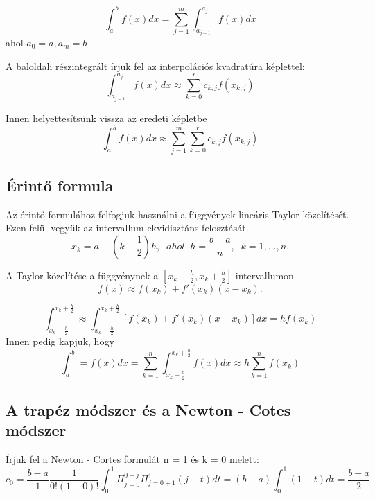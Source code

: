 \documentclass{article}
\theoremstyle{definition}
\theoremstyle{theorem}
\begin{document}
\begin{equation*}
 \int_a^{b} f(x) dx = \sum_{j = 1} ^{m} \int_{a_{j-1}} ^{a_j} f(x) dx
\end{equation*}
 ahol $a_0 = a, a_m =b $

A baloldali részintegrált írjuk fel az interpolációs kvadratúra képlettel:
\begin{equation*}
\int_{a_{j-1}}^{a_j} f(x) dx \approx \sum_{k=0}^{r} c_{k,j}f(x_{k,j})
\end{equation*}

Innen helyettesítsünk vissza az eredeti képletbe
\begin{equation*}
\int_a^b f(x) dx \approx \sum_{j=1}^{m} \sum_{k=0}^{r} c_{k,j} f(x_{k,j})
\end{equation*}


\subsection{Érintő formula}

Az érintő formulához felfogjuk használni a függvények lineáris Taylor közelítését. Ezen felül vegyük az intervallum ekvidisztáns felosztását.
\begin{equation*}
   x_k = a + (k - \frac{1}{2})h ,\;\; ahol\;\; h = \frac{b-a}{n},\;\; k =1,...,n.
\end{equation*}



A Taylor közelítése a függvénynek a $[x_k-\frac{h}{2},x_k+\frac{h}{2}]$ intervallumon
\begin{equation*}
    f(x) \approx f(x_k)+f'(x_k)(x-x_k).
\end{equation*}

\begin{equation*}
\int_{x_k-\frac{h}{2}}^{x_k + \frac{h}{2}} \approx \int_{x_k - \frac{h}{2}}^{x_k + \frac{h}{2}} [f(x_k) + f'(x_k)(x-x_k)] dx = hf(x_k)
\end{equation*}
\newline
Innen pedig kapjuk, hogy
\begin{equation*}
\int_a^b = f(x) dx = \sum_{k=1}^n \int_{x_k - \frac{h}{2}}^{x_k + \frac{h}{2}} f(x)dx \approx h \sum_{k=1}^n f(x_k)
\end{equation*}



\subsection{A trapéz módszer és a Newton - Cotes módszer}
Írjuk fel a Newton - Cortes formulát n = 1 és k = 0 melett:
\begin{equation*}
c_0 = \frac{b-a}{1} \frac{1}{0!(1-0)!} \int_0^{1} \Pi_{j=0}^{0-j} \Pi_{j=0+1}^{1} (j-t) dt = (b-a) \int_0^1 (1-t) dt = \frac{b-a}{2}
\end{equation*}
\end{document}
